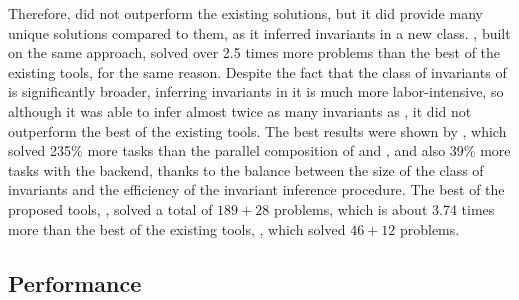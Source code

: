 
Therefore, \ringen{\cvc{}} did not outperform the existing solutions, but it did provide many unique solutions compared to them, as it inferred invariants in a new class. \ringen{\vampire{}} , built on the same approach, solved over 2.5 times more problems than the best of the existing tools, for the same reason. Despite the fact that the class of invariants of \ringenSync{} is significantly broader, inferring invariants in it is much more labor-intensive, so although it was able to infer almost twice as many invariants as \ringen{\cvc{}}, it did not outperform the best of the existing tools. The best results were shown by \ringenCICI{\cvc{}}, which solved 235\% more tasks than the parallel composition of \racer{} and \ringen{\cvc{}}, and also 39\% more tasks with the \vampire{} backend, thanks to the balance between the size of the class of invariants and the efficiency of the invariant inference procedure. The best of the proposed tools, \ringenCICI{\vampire{}}, solved a total of $189+28$ problems, which is about 3.74 times more than the best of the existing tools, \eldarica{}, which solved $46+12$ problems.

\subsection{Performance}\label{sec:evaluation/performance}

\toolplotOne{}

